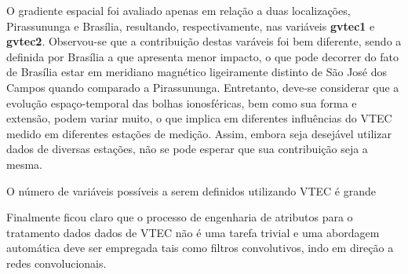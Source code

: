 O gradiente espacial foi avaliado apenas em relação a duas localizações, Pirassununga e Brasília, resultando, respectivamente, nas variáveis  {\bf gvtec1} e {\bf gvtec2}. Observou-se que a contribuição destas varáveis foi bem diferente, sendo a definida por Brasília a que apresenta menor impacto, o que pode decorrer do fato de Brasília estar em meridiano magnético ligeiramente distinto de São José dos Campos quando comparado a Pirassununga. Entretanto, deve-se considerar que a evolução espaço-temporal das bolhas ionosféricas, bem como sua forma e extensão, podem variar muito, o que implica em diferentes influências do VTEC medido em diferentes estações de medição. Assim, embora seja desejável utilizar dados de diversas estações, não se pode esperar que sua contribuição seja a mesma.

O número de variáveis possíveis a serem definidos utilizando VTEC é grande

Finalmente ficou claro que o processo de engenharia de atributos para o tratamento dados dados de VTEC não é uma tarefa trivial e uma abordagem automática deve ser empregada tais como filtros convolutivos, indo em direção a redes convolucionais.
